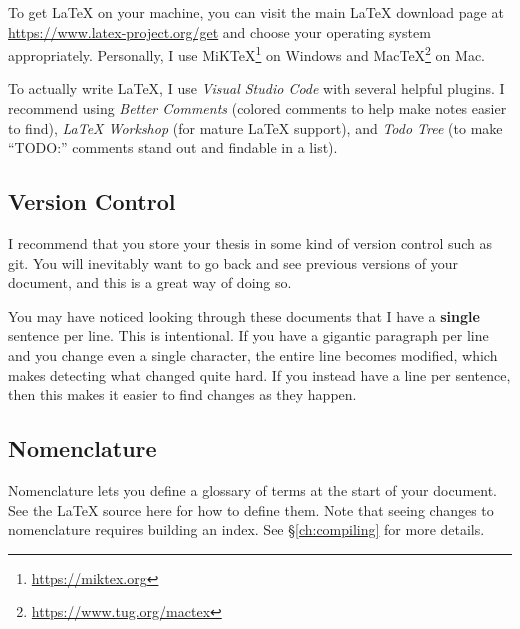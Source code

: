 To get \LaTeX{} on your machine, you can visit the main \LaTeX{} download page at \url{https://www.latex-project.org/get} and choose your operating system appropriately.
Personally, I use MiKTeX\footnote{\url{https://miktex.org}} on Windows and MacTeX\footnote{\url{https://www.tug.org/mactex}} on Mac.

To actually write \LaTeX{}, I use \textit{Visual Studio Code} with several helpful plugins.
I recommend using \textit{Better Comments} (colored comments to help make notes easier to find), \textit{LaTeX Workshop} (for mature LaTeX support), and \textit{Todo Tree} (to make ``TODO:'' comments stand out and findable in a list).


\subsection{Version Control}%
I recommend that you store your thesis in some kind of version control such as git.
You will inevitably want to go back and see previous versions of your document, and this is a great way of doing so.

You may have noticed looking through these documents that I have a \textbf{single} sentence per line.
This is intentional.
If you have a gigantic paragraph per line and you change even a single character, the entire line becomes modified, which makes detecting what changed quite hard.
If you instead have a line per sentence, then this makes it easier to find changes as they happen.

\subsection{Nomenclature}
Nomenclature lets you define a glossary of terms at the start of your document.
See the \LaTeX{} source here for how to define them.
Note that seeing changes to nomenclature requires building an index.
See \S\ref{ch:compiling} for more details.


